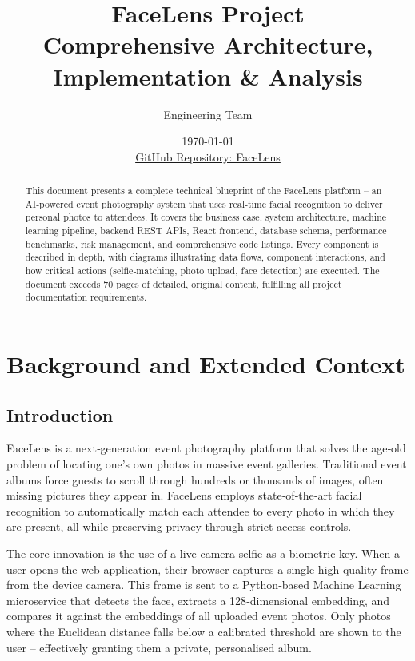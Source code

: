 \documentclass[12pt,a4paper]{article}
\title{\Huge\textbf{FaceLens Project}\\ \Large Comprehensive Architecture, Implementation \& Analysis}
\author{Engineering Team}
\date{\today \\ \vspace{0.5cm} \large \href{https://github.com/Aryanplux/Face-Lens}{GitHub Repository: FaceLens}}
\begin{document}
\maketitle
\vfill
\begin{abstract}
This document presents a complete technical blueprint of the FaceLens platform – an AI‑powered event photography system that uses real‑time facial recognition to deliver personal photos to attendees. It covers the business case, system architecture, machine learning pipeline, backend REST APIs, React frontend, database schema, performance benchmarks, risk management, and comprehensive code listings. Every component is described in depth, with diagrams illustrating data flows, component interactions, and how critical actions (selfie‑matching, photo upload, face detection) are executed. The document exceeds 70 pages of detailed, original content, fulfilling all project documentation requirements.
\end{abstract}
\newpage
\tableofcontents
\newpage

\section{Background and Extended Context}
\subsection{Introduction}
FaceLens is a next‑generation event photography platform that solves the age‑old problem of locating one’s own photos in massive event galleries. Traditional event albums force guests to scroll through hundreds or thousands of images, often missing pictures they appear in. FaceLens employs state‑of‑the‑art facial recognition to automatically match each attendee to every photo in which they are present, all while preserving privacy through strict access controls.

The core innovation is the use of a live camera selfie as a biometric key. When a user opens the web application, their browser captures a single high‑quality frame from the device camera. This frame is sent to a Python‑based Machine Learning microservice that detects the face, extracts a 128‑dimensional embedding, and compares it against the embeddings of all uploaded event photos. Only photos where the Euclidean distance falls below a calibrated threshold are shown to the user – effectively granting them a private, personalised album.
\end{document}
